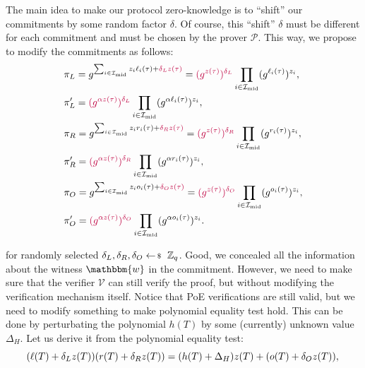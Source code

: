 \documentclass[../../book.tex]{subfiles}
\begin{document}
The main idea to make our protocol zero-knowledge is to ``shift'' our commitments by some random factor $\delta$. Of course, this ``shift'' $\delta$ must be different for each commitment and must be chosen by the prover $\mathcal{P}$. This way, we propose to modify the commitments as follows:
\begin{equation*}
    \begin{aligned}
        &\pi_L = g^{\sum_{i \in \mathcal{I}_{\text{mid}}}z_i\ell_i(\tau) + \textcolor{purple}{\delta_Lz(\tau)}} = \textcolor{purple}{(g^{z(\tau)})^{\delta_L}}\prod_{i \in \mathcal{I}_{\text{mid}}}(g^{\ell_i(\tau)})^{z_i}, \\ & \pi_L' = \textcolor{purple}{(g^{\alpha z(\tau)})^{\delta_L}}\prod_{i \in \mathcal{I}_{\text{mid}}}(g^{\alpha \ell_i(\tau)})^{z_i}, \\
        &\pi_R = g^{\sum_{i \in \mathcal{I}_{\text{mid}}}z_ir_i(\tau) + \textcolor{purple}{\delta_Rz(\tau)}} = \textcolor{purple}{(g^{z(\tau)})^{\delta_R}}\prod_{i \in \mathcal{I}_{\text{mid}}}(g^{r_i(\tau)})^{z_i}, \\ & \pi_R' = \textcolor{purple}{(g^{\alpha z(\tau)})^{\delta_R}}\prod_{i \in \mathcal{I}_{\text{mid}}}(g^{\alpha r_i(\tau)})^{z_i}, \\
        &\pi_O = g^{\sum_{i \in \mathcal{I}_{\text{mid}}}z_io_i(\tau) + \textcolor{purple}{\delta_Oz(\tau)}} = \textcolor{purple}{(g^{z(\tau)})^{\delta_O}}\prod_{i \in \mathcal{I}_{\text{mid}}}(g^{o_i(\tau)})^{z_i}, \\ & \pi_O' = \textcolor{purple}{(g^{\alpha z(\tau)})^{\delta_O}}\prod_{i \in \mathcal{I}_{\text{mid}}}(g^{\alpha o_i(\tau)})^{z_i}.
    \end{aligned}
\end{equation*}

for randomly selected $\delta_L, \delta_R, \delta_O \leftarrowS \mathbb{Z}_q$. Good, we concealed all the information about the witness $\mathbbm{w}$ in the commitment. However, we need to make sure that the verifier $\mathcal{V}$ can still verify the proof, but without modifying the verification mechanism itself. Notice that PoE verifications are still valid, but we need to modify something to make polynomial equality test hold. This can be done by perturbating the polynomial $h(T)$ by some (currently) unknown value $\Delta_H$. Let us derive it from the polynomial equality test:
\begin{equation*}
    (\ell(T) + \delta_L z(T))(r(T) + \delta_R z(T)) = (h(T) + \Delta_H)z(T) + (o(T) + \delta_O z(T)), \\
\end{equation*}
\end{document}
